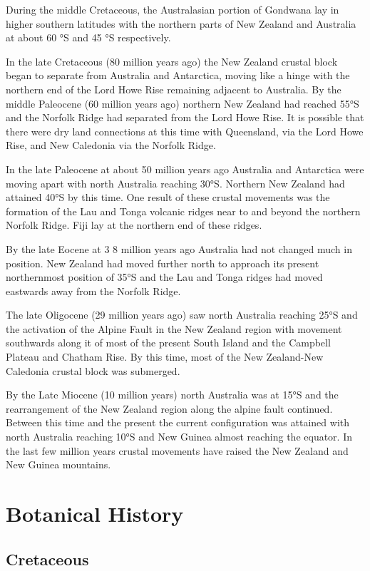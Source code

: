 During the middle Cretaceous, the Australasian portion of Gondwana lay in higher southern latitudes with the northern parts of New Zealand and Australia at about 60 °S and 45 °S respectively.

In the late Cretaceous (80 million years ago) the New Zealand crustal block began to separate from Australia and Antarctica, moving like a hinge with the northern end of the Lord Howe Rise remaining adjacent to Australia.
By the middle Paleocene (60 million years ago) northern New Zealand had reached 55°S and the Norfolk Ridge had separated from the Lord Howe Rise.
It is possible that there were dry land connections at this time with Queensland, via the Lord Howe Rise, and New Caledonia via the Norfolk Ridge.

In the late Paleocene at about 50 million years ago Australia and Antarctica were moving apart with north Australia reaching 30°S.
Northern New Zealand had attained 40°S by this time.
One result of these crustal movements was the formation of the Lau and Tonga volcanic ridges near to and beyond the northern Norfolk Ridge.
Fiji lay at the northern end of these ridges.

By the late Eocene at 3 8 million years ago Australia had not changed much in position.
New Zealand had moved further north to approach its present northernmost position of 35°S and the Lau and Tonga ridges had moved eastwards away from the Norfolk Ridge.

The late Oligocene (29 million years ago) saw north Australia reaching 25°S and the activation of the Alpine Fault in the New Zealand region with movement southwards along it of most of the present South Island and the Campbell Plateau and Chatham Rise.
By this time, most of the New Zealand-New Caledonia crustal block was submerged.

By the Late Miocene (10 million years) north Australia was at 15°S and the rearrangement of the New Zealand region along the alpine fault continued.
Between this time and the present the current configuration was attained with north Australia reaching 10°S and New Guinea almost reaching the equator.
In the last few million years crustal movements have raised the New Zealand and New Guinea mountains.

\section{Botanical History}

\subsection{Cretaceous}

